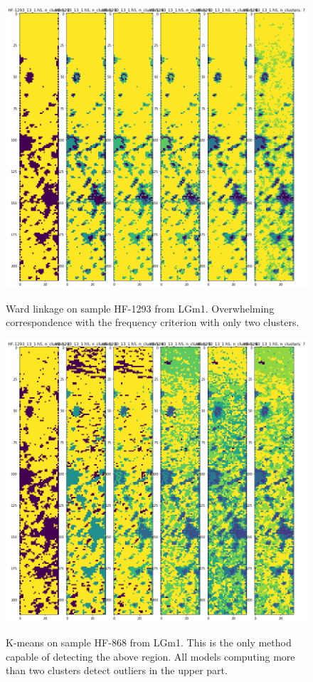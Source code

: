 \documentclass[a4paper, 12pt, oneside]{book}
\begin{document}
\begin{appendices}
\begin{figure}[H]
\end{figure}

\begin{figure}[H]

    \centering
{\includegraphics[width=15cm]{images/Ward_linkage/LGm-1/HF-1293_13_1.h5_1.png} }
\caption{Ward linkage on sample HF-1293 from LGm1. Overwhelming correspondence with the frequency criterion with only two clusters. \label{fig:SL_HF868}}%

\end{figure}

\begin{figure}[H]

    \centering
{\includegraphics[width=15cm]{images/KMeans_full/LGm-1/HF-1293_13_1.h5_1.png} }
\caption{K-means on sample HF-868 from LGm1. This is the only method capable of detecting the above region. All models computing more than two clusters detect outliers in the upper part.  \label{fig:SL_HF868}}%


\end{figure}
\end{appendices}
\end{document}
